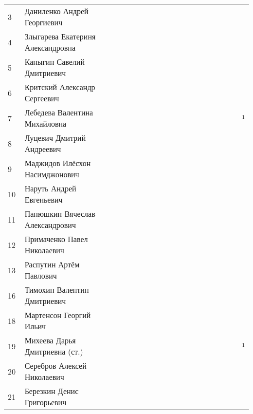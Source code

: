 \documentclass[a4paper,landscape,11pt]{article}
\newcommand*\ok{&{\small \ding{51}}} %
\newcommand*\no{&{\small }} %
\newcommand*\da{&{\small\ding{48}$\!\!_1$}} %
\begin{document}
\begin{tabular}{p{7pt}|l|p{6pt}p{6pt}p{6pt}p{6pt}p{6pt}p{6pt}p{6pt}p{6pt}p{6pt}p{6pt}p{6pt}p{6pt}p{6pt}p{6pt}p{6pt}p{6pt}p{6pt}p{6pt}}
 3\,&Даниленко Андрей Георгиевич        \ok\ok\ok\no\ok\ok\no\no\ok\ok\ok\ok\no\no\no\no\no\no\\
 4\,&Злыгарева Екатериня Александровна  \no\no\no\no\no\no\no\no\no\\
 5\,&Каныгин Савелий Дмитриевич         \ok\ok\ok\ok\ok\ok\ok\no\ok\ok\ok\ok\ok\ok\ok\ok\ok\ok\\
 6\,&Критский Александр Сергеевич       \no\no\no\no\no\no\no\no\no\\
 7\,&Лебедева Валентина Михайловна      \ok\ok\ok\ok\ok\ok\ok\ok\ok\ok\ok\ok\ok\ok\ok\ok\ok\da\\
 8\,&Луцевич Дмитрий Андреевич          \ok\ok\ok\ok\ok\ok\ok\no\ok\ok\ok\ok\ok\ok\\
 9\,&Маджидов Илёсхон Насимджонович     \no\no\no\no\no\no\no\no\no\\
10\,&Наруть Андрей Евгеньевич           \no\no\no\no\no\no\no\no\no\no\no\no\no\no\ok\no\ok\ok\\
11\,&Панюшкин Вячеслав Александрович    \ok\ok\ok\no\ok\ok\no\no\ok\ok\no\no\ok\no\ok\ok\ok\ok\\
\midrule
12\,&Примаченко Павел Николаевич        \ok\ok\ok\ok\ok\ok\ok\ok\ok\ok\ok\ok\ok\ok\ok\ok\ok\ok\\
13\,&Распутин Артём Павлович            \ok\ok\no\no\no\no\ok\ok\no\no\ok\ok\no\ok\ok\ok\ok\ok\\
16\,&Тимохин Валентин Дмитриевич        \ok\ok\ok\ok\ok\ok\ok\ok\ok\ok\ok\ok\no\no\ok\no\ok\no\\
18\,&Мартенсон Георгий Ильич            \ok\ok\ok\ok\ok\ok\ok\ok\ok\ok\ok\ok\ok\ok\ok\ok\ok\ok\\
19\,&Михеева Дарья Дмитриевна (ст.)     \ok\ok\ok\ok\ok\ok\ok\ok\ok\ok\ok\ok\ok\ok\ok\ok\ok\da\\
20\,&Серебров Алексей Николаевич        \ok\ok\ok\ok\ok\ok\no\ok\ok\ok\ok\ok\ok\ok\ok\ok\ok\ok\\
21\,&Березкин Денис Григорьевич         \no\no\no\no\ok\ok\no\no\no\no\ok\ok\no\no\no\no\no\no\\
\bottomrule
\end{tabular} 
\newpage
%
\hspace{-5cm}
\end{document}
